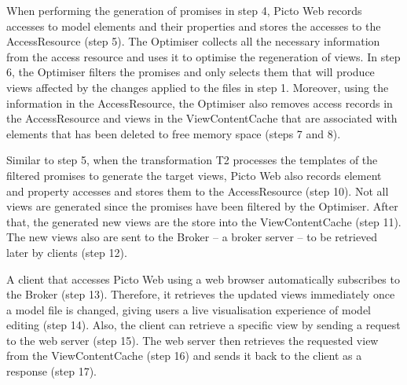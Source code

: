 When performing the generation of promises in step 4, Picto Web records accesses to model elements and their properties and stores the accesses to the \textsf{AccessResource} (step 5). The \textsf{Optimiser} collects all the necessary information from the access resource and uses it to optimise the regeneration of views. In step 6, the \textsf{Optimiser} filters the promises and only selects them that will produce views affected by the changes applied to the files in step 1. Moreover, using the information in the \textsf{AccessResource}, the \textsf{Optimiser} also removes access records in the \textsf{AccessResource} and views in the \textsf{ViewContentCache} that are associated with elements that has been deleted to free memory space (steps 7 and 8). 

Similar to step 5, when the transformation \textsf{T2} processes the templates of the filtered promises to generate the target views, Picto Web also records element and property accesses and stores them to the \textsf{AccessResource} (step 10). Not all views are generated since the promises have been filtered by the \textsf{Optimiser}. After that, the generated new views are the store into the \textsf{ViewContentCache} (step 11). The new views also are sent to the \textsf{Broker} -- a broker server --  to be retrieved later by clients (step 12).

A client that accesses Picto Web using a web browser automatically subscribes to the \textsf{Broker} (step 13). Therefore, it retrieves the updated views immediately once a model file is changed, giving users a live visualisation experience of model editing (step 14). Also, the client can retrieve a specific view by sending a request to the web server (step 15). The web server then retrieves the requested view from the \textsf{ViewContentCache} (step 16) and sends it back to the client as a response (step 17).








